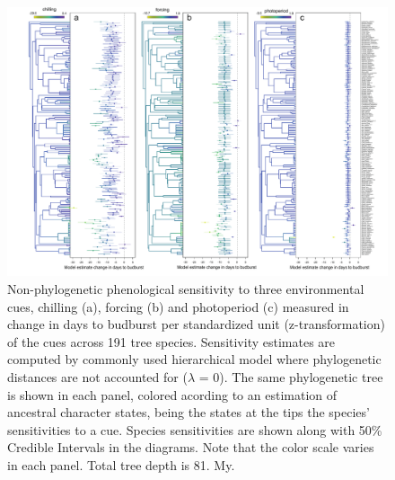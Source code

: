\documentclass[11pt]{article}
\begin{document}
\begin{figure}
  \begin{center}
  \includegraphics[width=16cm]{../../analyses/phylogeny/figures/FigSXX_ phylo_muplots191_lamb0.pdf}
  \caption{Non-phylogenetic phenological sensitivity to three environmental cues, chilling (a), forcing (b) and photoperiod (c) measured in change in days to budburst per standardized unit (z-transformation) of the cues across 191 tree species. Sensitivity estimates are computed by commonly used hierarchical model where phylogenetic distances are not accounted for ($\lambda$ = 0). The same phylogenetic tree is shown in each panel, colored acording to an estimation of ancestral character states, being the states at the tips the species' sensitivities to a cue. Species sensitivities are shown along with 50\% Credible Intervals in the diagrams. Note that the color scale varies in each panel. Total tree depth is 81. My.}
  \label{fig:suppmuplot_all} %
  \end{center}
\end{figure}
\end{document}
